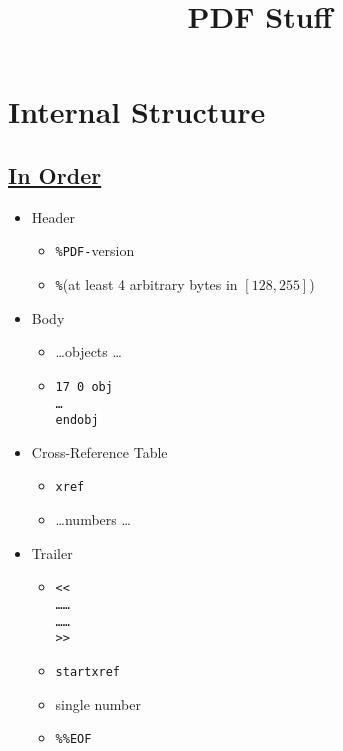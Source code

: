 \documentclass[a4paper,10pt]{article}
\title{PDF Stuff}
\author{}
\newcommand\pdfref[2]{\href{\pdfspecfile\##1}{#2}}
\begin{document}
\maketitle

\tableofcontents

\section{Internal Structure}
\subsection{\pdfref{G6.1877172}{In Order}}
\begin{itemize}
  \item Header
  \begin{itemize}
  \item \texttt{\%PDF-}version
  \item {\color{gray}\texttt{\%}(at least 4 arbitrary bytes in $[128,255]$)}
  \end{itemize}
  \item Body
  \begin{itemize}
  \item \ldots objects \ldots
  \item \texttt{17 0 obj\\\ldots\\endobj}
  \end{itemize}
  \item Cross-Reference Table
  \begin{itemize}
  \item \texttt{xref}
  \item \ldots numbers \ldots
  \end{itemize}
  \item Trailer
  \begin{itemize}
  \item \texttt{<<\\
  \ldots\quad\ldots\\
  \ldots\quad\ldots\\
  >>}
  \item \texttt{startxref}
  \item single number
  \item \texttt{\%\%EOF}
  \end{itemize}
\end{itemize}

\end{document}
